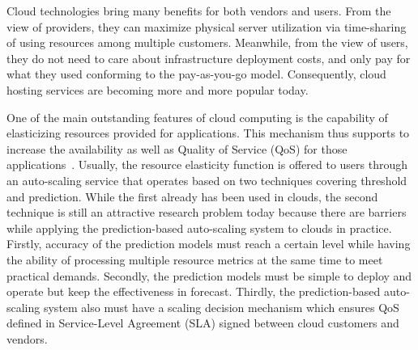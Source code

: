 \documentclass[runningheads]{llncs}
\begin{document}

Cloud technologies bring many benefits for both vendors and users. From the view of providers, they can maximize physical server utilization via time-sharing of using resources among multiple customers. Meanwhile, from the view of users, they do not need to care about infrastructure deployment costs, and only pay for what they used conforming to the pay-as-you-go model. Consequently, cloud hosting services are becoming more and more popular today.

One of the main outstanding features of cloud computing is the capability of elasticizing resources provided for applications. This mechanism thus supports to increase the availability as well as Quality of Service (QoS) for those applications~\cite{ref_hluchy}. Usually, the resource elasticity function is offered to users through an auto-scaling service that operates based on two techniques covering threshold and prediction. While the first already has been used in clouds, the second technique is still an attractive research problem today because there are barriers while applying the prediction-based auto-scaling system to clouds in practice. Firstly, accuracy of the prediction models must reach a certain level while having the ability of processing multiple resource metrics at the same time to meet practical demands. Secondly, the prediction models must be simple to deploy and operate but keep the effectiveness in forecast. Thirdly, the prediction-based auto-scaling system also must have a scaling decision mechanism which ensures QoS defined in Service-Level Agreement (SLA) signed between cloud customers and vendors. 
\end{document}
